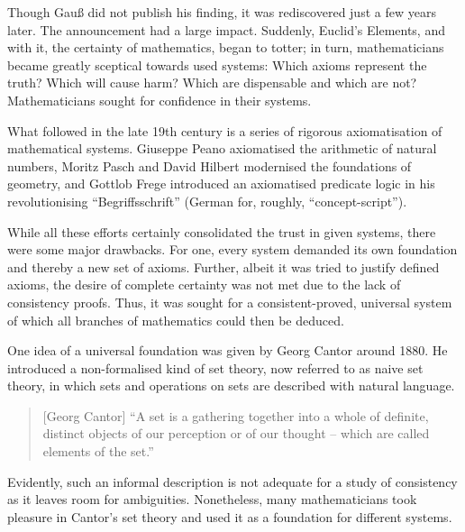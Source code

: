\documentclass{article}
\begin{document}
Though Gauß did not publish his finding, it was rediscovered just a few years later. The announcement had a large impact. Suddenly, Euclid's Elements, and with it, the certainty of mathematics, began to totter; in turn, mathematicians became greatly sceptical towards used systems: Which axioms represent the truth? Which will cause harm? Which are dispensable and which are not? Mathematicians sought for confidence in their systems.

What followed in the late 19th century is a series of rigorous axiomatisation of mathematical systems. Giuseppe Peano axiomatised the arithmetic of natural numbers, Moritz Pasch and David Hilbert modernised the foundations of geometry, and Gottlob Frege introduced an axiomatised predicate logic in his revolutionising ``Begriffsschrift'' (German for, roughly, ``concept-script'').

While all these efforts certainly consolidated the trust in given systems, there were some major drawbacks. For one, every system demanded its own foundation and thereby a new set of axioms. Further, albeit it was tried to justify defined axioms, the desire of complete certainty was not met due to the lack of consistency proofs. Thus, it was sought for a consistent-proved, universal system of which all branches of mathematics could then be deduced.

One idea of a universal foundation was given by Georg Cantor around 1880. He introduced a non-formalised kind of set theory, now referred to as naive set theory, in which sets and operations on sets are described with natural language. 
\begin{quote}[Georg Cantor]
``A set is a gathering together into a whole of definite, distinct objects of our perception or of our thought -- which are called elements of the set.''\cite{cantor_set}
\end{quote}
Evidently, such an informal description is not adequate for a study of consistency as it leaves room for ambiguities. Nonetheless, many mathematicians took pleasure in Cantor's set theory and used it as a foundation for different systems.
\end{document}
